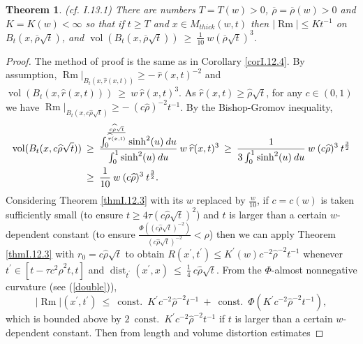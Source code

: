 \documentclass[12pt]{amsart}
\newcommand{\const}{\operatorname{const.}}
\newcommand{\dist}{\operatorname{dist}}
\newcommand{\Rm}{\operatorname{Rm}}
\newcommand{\vol}{\operatorname{vol}}
\numberwithin{equation}{section}
\theoremstyle{plain}
\newtheorem{theorem}[equation]{Theorem}
\theoremstyle{definition}
\theoremstyle{remark}
\begin{document}
\begin{theorem} (cf. I.13.1) \label{thmI.13.1}
There are numbers $T = T(w) > 0$, $\overline{\rho} = \overline{\rho}(w) > 0$
and $K = K(w) < \infty$ so that if $t \ge T$ and
$x \in M_{thick}(w,t)$ then $|\Rm| \le K t^{-1}$ on $B_t(x, \overline{\rho} \sqrt{t})$,
and $\vol(B_t(x, \overline{\rho} \sqrt{t})) \: \ge \: \frac{1}{10} \: 
w \left( \overline{\rho} \sqrt{t} \right)^3$.
\end{theorem}
\begin{proof}
The method of proof is the same as in Corollary \ref{corI.12.4}.  By assumption,
$\Rm \Big|_{B_t(x, \widehat{r}(x,t))} \ge - \: \widehat{r}(x,t)^{-2}$ and
$\vol(B_t(x, \widehat{r}(x,t))) \: \ge \: w \: \widehat{r}(x,t)^3$.   As
$\widehat{r}(x,t) \ge \widehat{\rho} \sqrt{t}$, for any $c \in (0,1)$ we have
$\Rm \Big|_{B_t(x, c\widehat{\rho} \sqrt{t})} \ge - \: (c\widehat{\rho})^{-2} t^{-1}$. By
the Bishop-Gromov inequality,
\begin{align}
\vol(B_t(x, c\widehat{\rho} \sqrt{t})) \: & \ge \: 
\frac{
\int_0^{ \frac{c \widehat{\rho} \sqrt{t}}{\widehat{r}(x,t)}} \sinh^2(u) \: du}{\int_0^1 \sinh^2(u) \: du}
\: w \: \widehat{r}(x,t)^3
\: \ge \: \frac{1}{3\int_0^1 \sinh^2(u) \: du} \: w \: 
(c\widehat{\rho})^3 \: t^{\frac32} \\
& \ge \:  \frac{1}{10} \: w \: 
(c\widehat{\rho})^3 \: t^{\frac32}. \notag
\end{align}   
Considering Theorem \ref{thmI.12.3} with its $w$ replaced by $\frac{w}{10}$,     
if $c = c(w)$ is taken sufficiently small 
(to ensure $t \ge 4 \tau (c \widehat{\rho} \sqrt{t})^2$)
and $t$ is larger than a certain
$w$-dependent constant 
(to ensure 
$\frac{\Phi((c \widehat{\rho} \sqrt{t})^{-2})}{(c 
\widehat{\rho} \sqrt{t})^{-2}} <\rho$)
then we can apply Theorem \ref{thmI.12.3} with
$r_0 =  c \widehat{\rho} \sqrt{t}$ to obtain
$R(x^\prime,t^\prime) \le K^\prime(w) c^{-2} \widehat{\rho}^{-2} t^{-1}$  whenever
$t^\prime \in [t - \tau c^2 \widehat{\rho}^2 t, t]$ and
$\dist_{t^\prime}(x^\prime, x) \: \le \: \frac14 \: c \widehat{\rho} \sqrt{t}$. From the
$\Phi$-almost nonnegative curvature (see (\ref{double})), 
\begin{equation}
|\Rm|(x^\prime, t^\prime) \: \le \: \const \:
K^\prime c^{-2} \widehat{\rho}^{-2} t^{-1} \: + \: \const \: 
\Phi(K^\prime c^{-2} \widehat{\rho}^{-2} t^{-1}),
\end{equation}
which is bounded above by $2 \: \const \: K^\prime c^{-2} \widehat{\rho}^{-2} t^{-1}$
if $t$ is larger than a certain
$w$-dependent constant. Then from length and volume distortion estimates

\end{proof}
\end{document}

